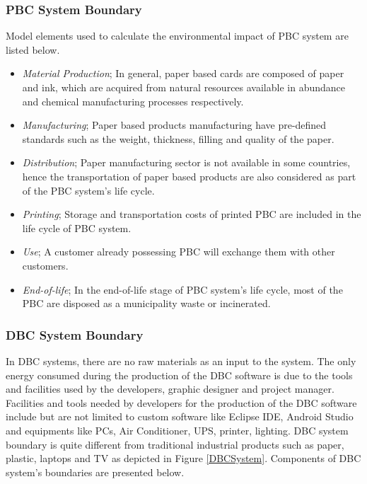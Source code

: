 \documentclass[conference]{IEEEtran}
\begin{document}
\subsubsection{PBC System Boundary}
Model elements used to calculate the environmental impact of PBC system are listed below. 

\begin{itemize}
\item {\em Material Production}; In general, paper based cards are composed of paper and ink, which are  acquired from natural resources available in abundance and chemical manufacturing processes respectively. 
\item {\em Manufacturing}; Paper based products manufacturing have pre-defined standards such as the weight, thickness, filling and quality of the paper.
\item {\em Distribution}; Paper manufacturing sector is not available in some countries, hence the transportation of paper based products are also considered as part of the PBC system's life cycle.
\item {\em Printing}; Storage and transportation costs of printed PBC are included in the life cycle of PBC system.
\item {\em Use}; A customer already possessing PBC will exchange them with other customers.
\item {\em End-of-life}; In the end-of-life stage of PBC system's life cycle, most of the PBC are disposed as a municipality waste or incinerated.
\end{itemize}


\subsubsection{DBC System Boundary}

In DBC systems, there are no raw materials as an input to the system. The only energy consumed during the production of the DBC software is due to the tools and facilities used by the developers, graphic designer and project manager. Facilities and tools needed by developers for the production of the DBC software include but are not limited to custom software like Eclipse IDE, Android Studio and equipments like PCs, Air Conditioner, UPS, printer, lighting. DBC system boundary is quite different from traditional industrial products such as paper, plastic, laptops and TV as depicted in Figure \ref{DBCSystem}. Components of DBC system's boundaries are presented below.
\end{document}
